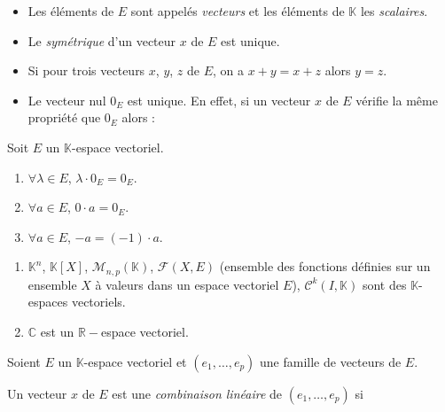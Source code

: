 \documentclass[french,11pt,twoside]{VcCours}
\begin{document}
\begin{Remarques}{}
\begin{itemize}
\item Les éléments de $E$ sont appelés \emph{vecteurs} et les éléments de $\mathbb{K}$ les \emph{scalaires}.
\item Le \emph{symétrique} d'un vecteur $x$ de $E$ est unique. 
\item Si pour trois vecteurs $x$, $y$, $z$ de $E$, on a $x+y=x+z$ alors $y=z$. 
\item Le vecteur nul $0_E$ est unique. En effet, si un vecteur $x$ de $E$ vérifie la même propriété que $0_E$ alors :

\vspace{1.5cm}
\end{itemize}
\end{Remarques}{}

\begin{Proposition}{}
Soit $E$ un $\mathbb{K}$-espace vectoriel.

\begin{enumerate}
\item $\forall \lambda \in E$, $\lambda \cdot 0_E= 0_E$.
\item $\forall a \in E$, $0 \cdot a=0_E$.
\item $\forall a \in E$, $-a=(-1) \cdot a$.
\end{enumerate}
\end{Proposition}

\medskip

\begin{Exemples}
\begin{enumerate}
\item $\mathbb{K}^n$, $\mathbb{K}[X]$, $\mathcal{M}_{n,p}(\mathbb{K})$, $\mathcal{F}(X,E)$ (ensemble des fonctions définies sur un ensemble $X$ à valeurs dans un espace vectoriel $E$), $\mathcal{C}^k(I, \mathbb{K})$ sont des $\mathbb{K}$-espaces vectoriels.
\item $\mathbb{C}$ est un $\mathbb{R}-$espace vectoriel.
\end{enumerate}
\end{Exemples}

\medskip

\begin{Definition}{} Soient $E$ un $\mathbb{K}$-espace vectoriel et $(e_1, \ldots, e_p)$ une famille de vecteurs de $E$.

Un vecteur $x$ de $E$ est une \emph{combinaison linéaire} de $(e_1, \ldots, e_p)$ si 
$$ \phantom{x = \sum_{k=1}^p \lambda_k e_k = \lambda_1 e_1 + \lambda_2 e_2 + \cdots + \lambda_p e_p }$$
\end{Definition}
\end{document}
